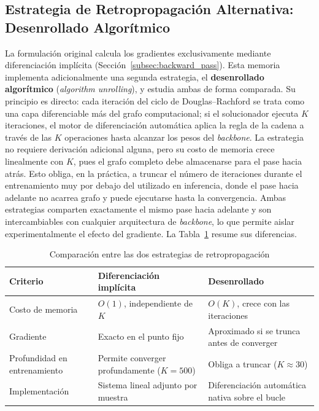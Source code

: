 \subsection{Estrategia de Retropropagación Alternativa: Desenrollado Algorítmico}
\label{subsec:unrolling}

La formulación original calcula los gradientes exclusivamente mediante diferenciación 
implícita (Sección~\ref{subsec:backward_pass}). Esta memoria implementa adicionalmente 
una segunda estrategia, el \textbf{desenrollado algorítmico} (\textit{algorithm 
unrolling}), y estudia ambas de forma comparada. Su principio es directo: cada 
iteración del ciclo de Douglas--Rachford se trata como una capa diferenciable más del 
grafo computacional; si el solucionador ejecuta $K$ iteraciones, el motor de 
diferenciación automática aplica la regla de la cadena a través de las $K$ operaciones 
hasta alcanzar los pesos del \textit{backbone}. La estrategia no requiere derivación 
adicional alguna, pero su costo de memoria crece linealmente con $K$, pues el grafo 
completo debe almacenarse para el pase hacia atrás. Esto obliga, en la práctica, a 
truncar el número de iteraciones durante el entrenamiento muy por debajo del utilizado en inferencia, donde el pase hacia 
adelante no acarrea grafo y puede ejecutarse hasta la convergencia. Ambas estrategias 
comparten exactamente el mismo pase hacia adelante y son intercambiables con cualquier 
arquitectura de \textit{backbone}, lo que permite aislar experimentalmente el efecto 
del gradiente. La Tabla~\ref{tab:comparacion_backward} resume sus diferencias.

\begin{table}[htpb]
\centering
\caption{Comparación entre las dos estrategias de retropropagación}
\label{tab:comparacion_backward}
\begin{tabular}{@{}p{3.2cm}p{5cm}p{5cm}@{}}
\toprule
\textbf{Criterio} & \textbf{Diferenciación implícita} & \textbf{Desenrollado} \\ \midrule
Costo de memoria & $O(1)$, independiente de $K$ & $O(K)$, crece con las iteraciones \\
Gradiente & Exacto en el punto fijo & Aproximado si se trunca antes de converger \\
Profundidad en entrenamiento & Permite converger profundamente ($K = 500$) & Obliga a 
truncar ($K \approx 30$) \\
Implementación & Sistema lineal adjunto por muestra & Diferenciación automática nativa 
sobre el bucle \\ \bottomrule
\end{tabular}
\end{table}

